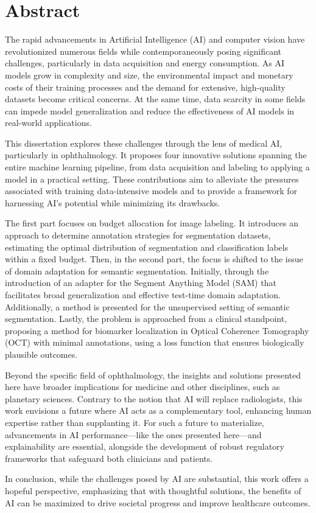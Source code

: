 \chapter*{Abstract}
The rapid advancements in Artificial Intelligence (AI) and computer vision have revolutionized numerous fields while contemporaneously posing significant challenges, particularly in data acquisition and energy consumption. As AI models grow in complexity and size, the environmental impact and monetary costs of their training processes and the demand for extensive, high-quality datasets become critical concerns. At the same time, data scarcity in some fields can impede model generalization and reduce the effectiveness of AI models in real-world applications. 

This dissertation explores these challenges through the lens of medical AI, particularly in ophthalmology. It proposes four innovative solutions spanning the entire machine learning pipeline, from data acquisition and labeling to applying a model in a practical setting. These contributions aim to alleviate the pressures associated with training data-intensive models and to provide a framework for harnessing AI's potential while minimizing its drawbacks.

The first part focuses on budget allocation for image labeling. It introduces an approach to determine annotation strategies for segmentation datasets, estimating the optimal distribution of segmentation and classification labels within a fixed budget. Then, in the second part, the focus is shifted to the issue of domain adaptation for semantic segmentation. Initially, through the introduction of an adapter for the Segment Anything Model (SAM) that facilitates broad generalization and effective test-time domain adaptation. Additionally, a method is presented for the unsupervised setting of semantic segmentation. Lastly, the problem is approached from a clinical standpoint, proposing a method for biomarker localization in Optical Coherence Tomography (OCT) with minimal annotations, using a loss function that ensures biologically plausible outcomes.

Beyond the specific field of ophthalmology, the insights and solutions presented here have broader implications for medicine and other disciplines, such as planetary sciences. Contrary to the notion that AI will replace radiologists, this work envisions a future where AI acts as a complementary tool, enhancing human expertise rather than supplanting it. For such a future to materialize, advancements in AI performance---like the ones presented here---and explainability are essential, alongside the development of robust regulatory frameworks that safeguard both clinicians and patients.

In conclusion, while the challenges posed by AI are substantial, this work offers a hopeful perspective, emphasizing that with thoughtful solutions, the benefits of AI can be maximized to drive societal progress and improve healthcare outcomes.


